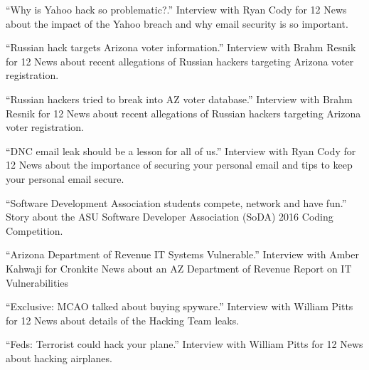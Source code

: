 \documentclass[11pt,letterpaper,sans]{moderncv}
\begin{document}
 {``Why is Yahoo hack so problematic?.'' Interview with Ryan Cody for 12 News about the impact of the Yahoo breach and why email security is so important.}

 {``Russian hack targets Arizona voter
  information.'' Interview with Brahm Resnik for 12 News about recent allegations of Russian hackers targeting Arizona voter registration.}

 {``Russian hackers tried to break into AZ
  voter database.'' Interview with Brahm Resnik for 12 News about recent allegations of Russian hackers targeting Arizona voter registration.}

 {``DNC email leak should be a lesson for all
  of us.'' Interview with Ryan Cody for 12 News about the importance of securing your personal email and tips to keep your personal email secure.}

 {``Software Development Association students
  compete, network and have fun.'' Story about the ASU Software Developer Association (SoDA) 2016 Coding Competition.}

 {``Arizona Department of Revenue IT Systems
  Vulnerable.'' Interview with Amber Kahwaji for Cronkite News about an AZ Department of Revenue Report on IT Vulnerabilities}

 {``Exclusive: MCAO talked about buying
  spyware.'' Interview with William Pitts for 12 News about details of the Hacking Team leaks.}

 {``Feds: Terrorist could hack your plane.'' Interview with William Pitts for 12 News about hacking airplanes.}
\end{document}
